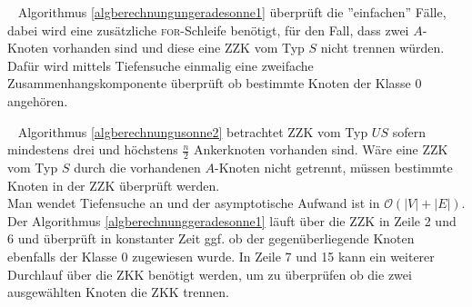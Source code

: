 \vspace{-2mm}
~\linebreak 
Algorithmus \ref{algberechnungungeradesonne1} überprüft die ''einfachen'' Fälle, dabei wird eine zusätzliche \textsc{for}-Schleife benötigt, für den Fall, dass zwei $A$-Knoten vorhanden sind und diese eine ZZK vom Typ $S$ nicht trennen würden. Dafür wird mittels Tiefensuche einmalig eine zweifache Zusammenhangskomponente überprüft ob bestimmte Knoten der Klasse $0$ angehören.\\
\vspace{-4mm}
\begin{algorithm}
\caption{$US(x)$}
\begin{algorithmic}[1]
\ENDIF
\end{algorithmic}
\label{algberechnungusonne2}
\end{algorithm}
\vspace{-4mm}
~\linebreak
Algorithmus \ref{algberechnungusonne2} betrachtet ZZK vom Typ $US$ sofern mindestens drei und höchstens $\frac{n}{2}$ Ankerknoten vorhanden sind. Wäre eine ZZK vom Typ $S$ durch die vorhandenen $A$-Knoten nicht getrennt, müssen bestimmte Knoten in der ZZK überprüft werden.\\
Man wendet Tiefensuche an und der asymptotische Aufwand ist in $\mathcal{O}(|V|+|E|)$.\newpage
Der Algorithmus \ref{algberechnunggeradesonne1} läuft über die ZZK in Zeile 2 und 6 und überprüft in konstanter Zeit ggf. ob der gegenüberliegende Knoten ebenfalls der Klasse $0$ zugewiesen wurde. In Zeile 7 und 15 kann ein weiterer Durchlauf über die ZKK benötigt werden, um zu überprüfen ob die zwei ausgewählten Knoten die ZKK trennen.\newline
\vspace{-5mm}
